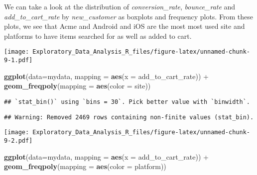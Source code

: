 \documentclass[]{article}
\newenvironment{Shaded}{\begin{snugshade}}{\end{snugshade}}
\newcommand{\KeywordTok}[1]{\textcolor[rgb]{0.13,0.29,0.53}{\textbf{{#1}}}}
\newcommand{\DataTypeTok}[1]{\textcolor[rgb]{0.13,0.29,0.53}{{#1}}}
\newcommand{\StringTok}[1]{\textcolor[rgb]{0.31,0.60,0.02}{{#1}}}
\newcommand{\OtherTok}[1]{\textcolor[rgb]{0.56,0.35,0.01}{{#1}}}
\newcommand{\NormalTok}[1]{{#1}}
\begin{document}
We can take a look at the distribution of \emph{conversion\_rate},
\emph{bounce\_rate} and \emph{add\_to\_cart\_rate} by
\emph{new\_customer} as boxplots and frequency plots. From these plots,
we see that Acme and Android and iOS are the most most used site and
platforms to have items searched for as well as added to cart.

\begin{Shaded}
\end{Shaded}

\texttt{[image: Exploratory\_Data\_Analysis\_R\_files/figure-latex/unnamed-chunk-9-1.pdf]}

\begin{Shaded}
\begin{Highlighting}[]
\KeywordTok{ggplot}\NormalTok{(}\DataTypeTok{data=}\NormalTok{mydata, }\DataTypeTok{mapping =} \KeywordTok{aes}\NormalTok{(}\DataTypeTok{x =} \NormalTok{add_to_cart_rate)) +}
\StringTok{  }\KeywordTok{geom_freqpoly}\NormalTok{(}\DataTypeTok{mapping =} \KeywordTok{aes}\NormalTok{(}\DataTypeTok{color =} \NormalTok{site))}
\end{Highlighting}
\end{Shaded}

\begin{verbatim}
## `stat_bin()` using `bins = 30`. Pick better value with `binwidth`.
\end{verbatim}

\begin{verbatim}
## Warning: Removed 2469 rows containing non-finite values (stat_bin).
\end{verbatim}

\texttt{[image: Exploratory\_Data\_Analysis\_R\_files/figure-latex/unnamed-chunk-9-2.pdf]}

\begin{Shaded}
\begin{Highlighting}[]
\KeywordTok{ggplot}\NormalTok{(}\DataTypeTok{data=}\NormalTok{mydata, }\DataTypeTok{mapping =} \KeywordTok{aes}\NormalTok{(}\DataTypeTok{x =} \NormalTok{add_to_cart_rate)) +}
\StringTok{  }\KeywordTok{geom_freqpoly}\NormalTok{(}\DataTypeTok{mapping =} \KeywordTok{aes}\NormalTok{(}\DataTypeTok{color =} \NormalTok{platform))}
\end{Highlighting}
\end{Shaded}
\end{document}
